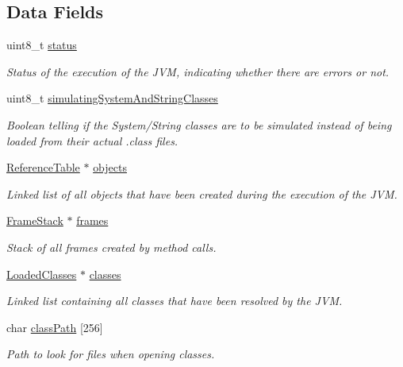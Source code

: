 \subsection*{Data Fields}
\begin{DoxyCompactItemize}
\item 
uint8\+\_\+t \hyperlink{structJavaVirtualMachine_ae8571f20c0db273c88a5ce2d52d51a04}{status}
\begin{DoxyCompactList}\small\item\em Status of the execution of the J\+VM, indicating whether there are errors or not. \end{DoxyCompactList}\item 
uint8\+\_\+t \hyperlink{structJavaVirtualMachine_a98897bec4e614dd62c3d5b1543efd57d}{simulating\+System\+And\+String\+Classes}
\begin{DoxyCompactList}\small\item\em Boolean telling if the System/\+String classes are to be simulated instead of being loaded from their actual .class files. \end{DoxyCompactList}\item 
\hyperlink{structReferenceTable}{Reference\+Table} $\ast$ \hyperlink{structJavaVirtualMachine_a7513525a761cf3172a0ed080cafcee06}{objects}
\begin{DoxyCompactList}\small\item\em Linked list of all objects that have been created during the execution of the J\+VM. \end{DoxyCompactList}\item 
\hyperlink{structFrameStack}{Frame\+Stack} $\ast$ \hyperlink{structJavaVirtualMachine_a6a0d723bb649fabc57742221b01b3617}{frames}
\begin{DoxyCompactList}\small\item\em Stack of all frames created by method calls. \end{DoxyCompactList}\item 
\hyperlink{structLoadedClasses}{Loaded\+Classes} $\ast$ \hyperlink{structJavaVirtualMachine_a36266aec8ba9d25b4d9f67509967dd4c}{classes}
\begin{DoxyCompactList}\small\item\em Linked list containing all classes that have been resolved by the J\+VM. \end{DoxyCompactList}\item 
char \hyperlink{structJavaVirtualMachine_a62e35894409c262231bcae405b4e291b}{class\+Path} \mbox{[}256\mbox{]}
\begin{DoxyCompactList}\small\item\em Path to look for files when opening classes. \end{DoxyCompactList}\end{DoxyCompactItemize}


